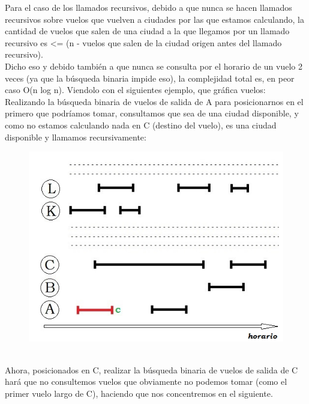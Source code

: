 \documentclass[10pt,a4paper]{article}
\begin{document}
Para el caso de los llamados recursivos, debido a que nunca se hacen llamados recursivos sobre vuelos que vuelven a ciudades por las que estamos calculando, la cantidad de vuelos que salen de una ciudad a la que llegamos por un llamado recursivo es \textless = (n - vuelos que salen de la ciudad origen antes del llamado recursivo).\\
Dicho eso y debido también a que nunca se consulta por el horario de un vuelo 2 veces (ya que la búsqueda binaria impide eso), la complejidad total es, en peor caso O(n log n). Viendolo con el siguientes ejemplo, que gráfica vuelos:\\

Realizando la búsqueda binaria de vuelos de salida de A para posicionarnos en el primero que podríamos tomar, consultamos que sea de una ciudad disponible, y como no estamos calculando nada en C (destino del vuelo), es una ciudad disponible y llamamos recursivamente:
\begin{figure}[h]
	\begin{center}
	   \includegraphics[scale=0.60]{imagenes/demo3.jpg}
	\end{center}
\end{figure}\\
Ahora, posicionados en C, realizar la búsqueda binaria de vuelos de salida de C hará que no consultemos vuelos que obviamente no podemos tomar (como el primer vuelo largo de C), haciendo que nos concentremos en el siguiente.
\end{document}
